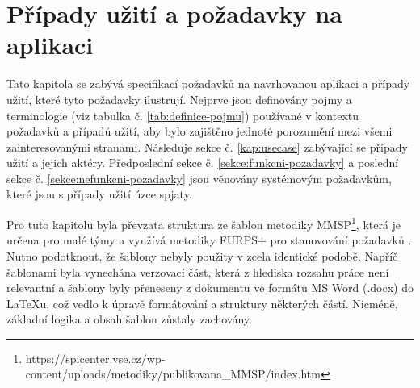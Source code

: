 \chapter{Případy užití a požadavky na aplikaci}

Tato kapitola se zabývá specifikací požadavků na navrhovanou aplikaci a případy užití, které tyto požadavky ilustrují. Nejprve jsou definovány pojmy a terminologie (viz tabulka č. \ref{tab:definice-pojmu}) používané v kontextu požadavků a případů užití, aby bylo zajištěno jednoté porozumění mezi všemi zainteresovanými stranami. Následuje sekce č. \ref{kap:usecase} zabývající se případy užití  a jejich aktéry. Předposlední sekce č. \ref{sekce:funkcni-pozadavky} a poslední sekce č. \ref{sekce:nefunkcni-pozadavky} jsou věnovány systémovým požadavkům, které jsou s případy užití úzce spjaty.

Pro tuto kapitolu byla převzata struktura ze šablon metodiky MMSP\footnote{https://spicenter.vse.cz/wp-content/uploads/metodiky/publikovana\_MMSP/index.htm}, která je určena pro malé týmy a využívá metodiky FURPS+ pro stanovování požadavků \parencite{rejnkovaLokalizacePrizpusobeniMetodiky}. Nutno podotknout, že šablony nebyly použity v zcela identické podobě. Napříč šablonami byla vynechána verzovací část, která z hlediska rozsahu práce není relevantní a šablony byly přeneseny z dokumentu ve formátu MS Word (.docx) do \LaTeX u, což vedlo k úpravě formátování a struktury některých částí. Nicméně, základní logika a obsah šablon zůstaly zachovány.

